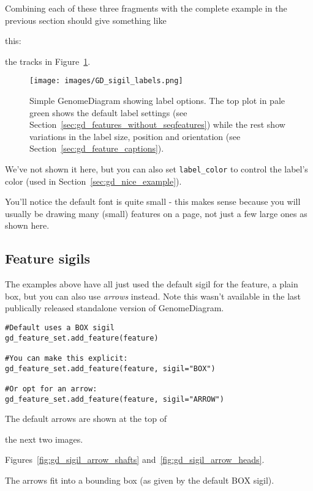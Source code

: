 \documentclass{report}
\begin{document}
\noindent Combining each of these three fragments with the complete example
in the previous section should give something like
\begin{htmlonly}
this:

\label{fig:gd_sigil_labels}

\end{htmlonly}
\begin{latexonly}
the tracks in Figure~\ref{fig:gd_sigil_labels}.
\begin{figure}[htbp]
\centering
\texttt{[image: images/GD\_sigil\_labels.png]}
\caption{Simple GenomeDiagram showing label options.
The top plot in pale green shows the default label settings (see
Section~\ref{sec:gd_features_without_seqfeatures}) while the rest show
variations in the label size, position and orientation (see
Section~\ref{sec:gd_feature_captions}).
}
\label{fig:gd_sigil_labels}
\end{figure}
\end{latexonly}

We've not shown it here, but you can also set \texttt{label\_color} to
control the label's color (used in Section~\ref{sec:gd_nice_example}).

You'll notice the default font is quite small - this makes sense because
you will usually be drawing many (small) features on a page, not just a
few large ones as shown here.

\subsection{Feature sigils}
\label{sec:gd_arrow_sigils}

The examples above have all just used the default sigil for the feature, a
plain box, but you can also use \emph{arrows} instead.  Note this wasn't
available in the last publically released standalone version of
GenomeDiagram.

\begin{verbatim}
#Default uses a BOX sigil
gd_feature_set.add_feature(feature)

#You can make this explicit:
gd_feature_set.add_feature(feature, sigil="BOX")

#Or opt for an arrow:
gd_feature_set.add_feature(feature, sigil="ARROW")
\end{verbatim}

The default arrows are shown at the top of
\begin{htmlonly}
the next two images.
\end{htmlonly}
\begin{latexonly}
Figures~\ref{fig:gd_sigil_arrow_shafts} and~\ref{fig:gd_sigil_arrow_heads}.
\end{latexonly}
The arrows fit into a bounding box (as given by the default BOX sigil).
\end{document}
